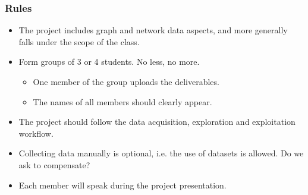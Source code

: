 \documentclass{beamer}
\newcommand{\todo}[1]{{\color{red} #1}}
\begin{document}

\begin{frame}
	\frametitle{Rules}
	\begin{itemize}
		\item The project includes graph and network data aspects, and more generally falls under the scope of the class.
		\vfill
		\item Form groups of 3 or 4 students. No less, no more.
			\begin{itemize}
				\item One member of the group uploads the deliverables.
				\item The names of all members should clearly appear.
			\end{itemize}
		\vfill
		\item The project should follow the data acquisition, exploration and exploitation workflow.
		\vfill
		\item Collecting data manually is optional, i.e. the use of datasets is allowed. \todo{Do we ask to compensate?}
		\vfill
		\item Each member will speak during the project presentation.
	\end{itemize}
\end{frame}

\end{document}
